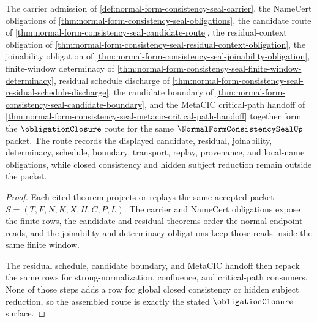 \begin{theorem}
\label{thm:normal-form-consistency-seal-obligation-closure-route}
The carrier admission of \autoref{def:normal-form-consistency-seal-carrier}, the NameCert obligations of \autoref{thm:normal-form-consistency-seal-obligations}, the candidate route of \autoref{thm:normal-form-consistency-seal-candidate-route}, the residual-context obligation of \autoref{thm:normal-form-consistency-seal-residual-context-obligation}, the joinability obligation of \autoref{thm:normal-form-consistency-seal-joinability-obligation}, finite-window determinacy of \autoref{thm:normal-form-consistency-seal-finite-window-determinacy}, residual schedule discharge of \autoref{thm:normal-form-consistency-seal-residual-schedule-discharge}, the candidate boundary of \autoref{thm:normal-form-consistency-seal-candidate-boundary}, and the MetaCIC critical-path handoff of \autoref{thm:normal-form-consistency-seal-metacic-critical-path-handoff} together form the $\obligationClosure$ route for the same $\NormalFormConsistencySealUp$ packet. The route records the displayed candidate, residual, joinability, determinacy, schedule, boundary, transport, replay, provenance, and local-name obligations, while closed consistency and hidden subject reduction remain outside the packet.
\end{theorem}
\begin{proof}
Each cited theorem projects or replays the same accepted packet $S=(T,F,N,K,X,H,C,P,L)$. The carrier and NameCert obligations expose the finite rows, the candidate and residual theorems order the normal-endpoint reads, and the joinability and determinacy obligations keep those reads inside the same finite window.

The residual schedule, candidate boundary, and MetaCIC handoff then repack the same rows for strong-normalization, confluence, and critical-path consumers. None of those steps adds a row for global closed consistency or hidden subject reduction, so the assembled route is exactly the stated $\obligationClosure$ surface.
\end{proof}





